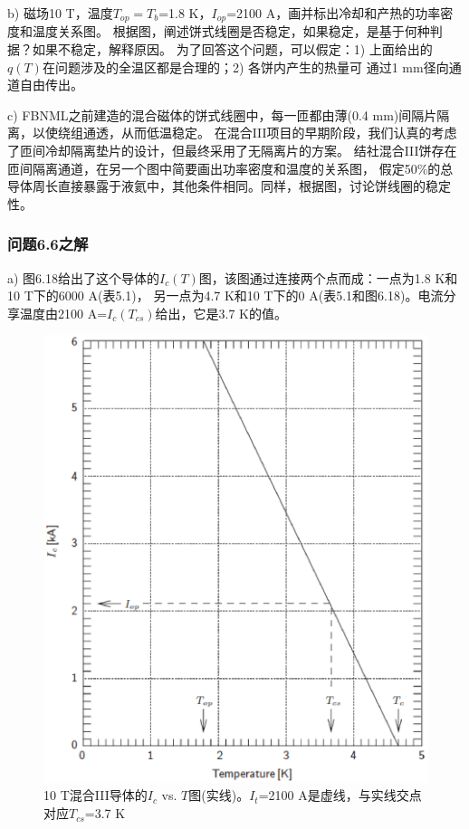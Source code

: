 b) 磁场10 T，温度$T_{op}=T_b$=1.8 K，$I_{op}$=2100 A，画并标出冷却和产热的功率密度和温度关系图。
根据图，阐述饼式线圈是否稳定，如果稳定，是基于何种判据？如果不稳定，解释原因。
为了回答这个问题，可以假定：1) 上面给出的$q(T)$在问题涉及的全温区都是合理的；2) 各饼内产生的热量可
通过1 mm径向通道自由传出。

c) FBNML之前建造的混合磁体的饼式线圈中，每一匝都由薄(0.4 mm)间隔片隔离，以使绕组通透，从而低温稳定。
在混合III项目的早期阶段，我们认真的考虑了匝间冷却隔离垫片的设计，但最终采用了无隔离片的方案。
结社混合III饼存在匝间隔离通道，在另一个图中简要画出功率密度和温度的关系图，
假定50\%的总导体周长直接暴露于液氦中，其他条件相同。同样，根据图，讨论饼线圈的稳定性。


\subsubsection{问题6.6之解}
a) 图6.18给出了这个导体的$I_c(T)$图，该图通过连接两个点而成：一点为1.8 K和10 T下的6000 A(表5.1)，
另一点为4.7 K和10 T下的0 A(表5.1和图6.18)。电流分享温度由2100 A=$I_c(T_{cs})$给出，它是3.7 K的值。
\begin{figure}[htbp]
	\centering
	\includegraphics[scale=0.7]{chpt6/figs/fig6.18.eps}
	\caption{10 T混合III导体的$I_c$ vs. $T$图(实线)。$I_t$=2100 A是虚线，与实线交点对应$T_{cs}$=3.7 K}
\end{figure}

